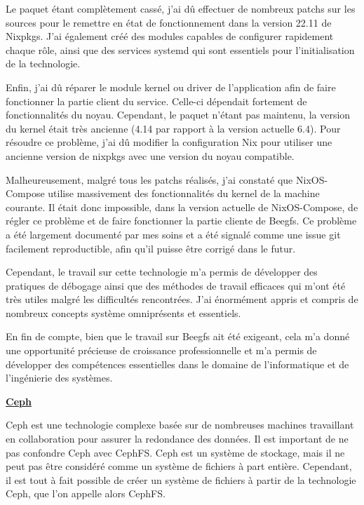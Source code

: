 \documentclass[a4paper,french,12pt, titlepage]{article}
\begin{document}
Le paquet étant complètement cassé, j'ai dû effectuer de nombreux patchs
sur les sources pour le remettre en état de fonctionnement dans la
version 22.11 de Nixpkgs. J'ai également créé des modules capables de
configurer rapidement chaque rôle, ainsi que des services systemd qui
sont essentiels pour l'initialisation de la technologie.\newline

Enfin, j'ai dû réparer le module kernel ou driver de l'application afin
de faire fonctionner la partie client du service. Celle-ci dépendait
fortement de fonctionnalités du noyau. Cependant, le paquet n'étant pas
maintenu, la version du kernel était très ancienne (4.14 par rapport à
la version actuelle 6.4). Pour résoudre ce problème, j'ai dû modifier la
configuration Nix pour utiliser une ancienne version de nixpkgs avec une
version du noyau compatible.\newline

Malheureusement, malgré tous les patchs réalisés, j'ai constaté que
NixOS-Compose utilise massivement des fonctionnalités du kernel de la
machine courante. Il était donc impossible, dans la version actuelle de
NixOS-Compose, de régler ce problème et de faire fonctionner la partie
cliente de Beegfs. Ce problème a été largement documenté par mes soins
et a été signalé comme une issue git facilement reproductible, afin
qu'il puisse être corrigé dans le futur.\newline

Cependant, le travail sur cette technologie m'a permis de développer des
pratiques de débogage ainsi que des méthodes de travail efficaces qui
m'ont été très utiles malgré les difficultés rencontrées. J'ai
énormément appris et compris de nombreux concepts système omniprésents
et essentiels.

En fin de compte, bien que le travail sur Beegfs ait été exigeant, cela
m'a donné une opportunité précieuse de croissance professionnelle et m'a
permis de développer des compétences essentielles dans le domaine de
l'informatique et de l'ingénierie des systèmes.\newline

\textbf{\href{https://docs.ceph.com/en/quincy/}{Ceph} \cite{ceph2006}}

Ceph est une technologie complexe basée sur de nombreuses machines
travaillant en collaboration pour assurer la redondance des données. Il
est important de ne pas confondre Ceph avec CephFS. Ceph est un système
de stockage, mais il ne peut pas être considéré comme un système de
fichiers à part entière. Cependant, il est tout à fait possible de créer
un système de fichiers à partir de la technologie Ceph, que l'on appelle
alors CephFS.\newline
\end{document}
